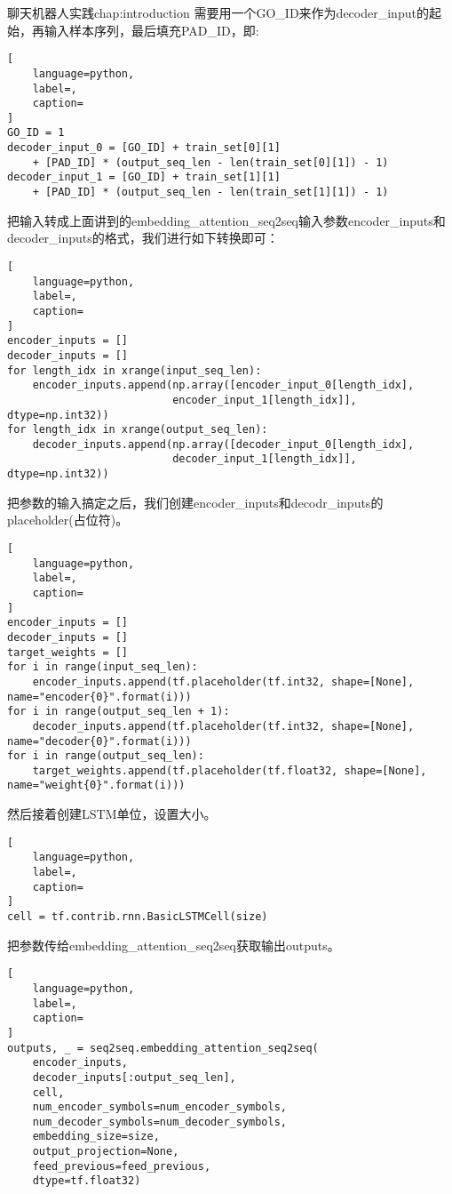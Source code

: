 \begin{cuzchapter}{聊天机器人实践}{chap:introduction}
需要用一个GO\_ID来作为decoder\_input的起始，再输入样本序列，最后填充PAD\_ID，即:
\begin{lstlisting}[
    language=python,
    label=,
    caption=
]
GO_ID = 1
decoder_input_0 = [GO_ID] + train_set[0][1] 
    + [PAD_ID] * (output_seq_len - len(train_set[0][1]) - 1)
decoder_input_1 = [GO_ID] + train_set[1][1] 
    + [PAD_ID] * (output_seq_len - len(train_set[1][1]) - 1)
\end{lstlisting}

把输入转成上面讲到的embedding\_attention\_seq2seq输入参数encoder\_inputs和decoder\_inputs的格式，我们进行如下转换即可：
\begin{lstlisting}[
    language=python,
    label=,
    caption=
]
encoder_inputs = []
decoder_inputs = []
for length_idx in xrange(input_seq_len):
    encoder_inputs.append(np.array([encoder_input_0[length_idx], 
                          encoder_input_1[length_idx]], dtype=np.int32))
for length_idx in xrange(output_seq_len):
    decoder_inputs.append(np.array([decoder_input_0[length_idx], 
                          decoder_input_1[length_idx]], dtype=np.int32))
\end{lstlisting}

把参数的输入搞定之后，我们创建encoder\_inputs和decodr\_inputs的placeholder(占位符)。
\begin{lstlisting}[
    language=python,
    label=,
    caption=
]
encoder_inputs = []
decoder_inputs = []
target_weights = []
for i in range(input_seq_len):
    encoder_inputs.append(tf.placeholder(tf.int32, shape=[None], name="encoder{0}".format(i)))
for i in range(output_seq_len + 1):
    decoder_inputs.append(tf.placeholder(tf.int32, shape=[None], name="decoder{0}".format(i)))
for i in range(output_seq_len):
    target_weights.append(tf.placeholder(tf.float32, shape=[None], name="weight{0}".format(i)))
\end{lstlisting}

然后接着创建LSTM单位，设置大小。
\begin{lstlisting}[
    language=python,
    label=,
    caption=
]
cell = tf.contrib.rnn.BasicLSTMCell(size)
\end{lstlisting}

把参数传给embedding\_attention\_seq2seq获取输出outputs。
\begin{lstlisting}[
    language=python,
    label=,
    caption=
]
outputs, _ = seq2seq.embedding_attention_seq2seq(
    encoder_inputs,
    decoder_inputs[:output_seq_len],
    cell,
    num_encoder_symbols=num_encoder_symbols,
    num_decoder_symbols=num_decoder_symbols,
    embedding_size=size,
    output_projection=None,
    feed_previous=feed_previous,
    dtype=tf.float32)
\end{lstlisting}


\end{cuzchapter}
